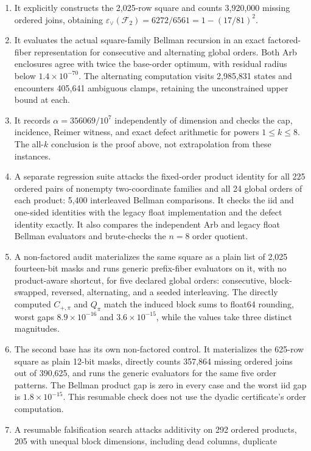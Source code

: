 \documentclass[11pt]{article}
\theoremstyle{remark}
\newcommand{\F}{\mathcal F}
\newcommand{\eps}{\varepsilon}
\begin{document}
\begin{enumerate}
\item It explicitly constructs the 2,025-row square and counts 3,920,000
missing ordered joins, obtaining
$\eps_\vee(\F_2)=6272/6561=1-(17/81)^2$.
\item It evaluates the actual square-family Bellman recursion in an exact
factored-fiber representation for consecutive and alternating global orders.
Both Arb enclosures agree with twice the base-order optimum, with residual
radius below $1.4\times10^{-70}$.  The alternating computation visits
2,985,831 states and encounters 405,641 ambiguous clamps, retaining the
unconstrained upper bound at each.
\item It records $\alpha=356069/10^7$ independently of dimension and checks the
cap, incidence, Reimer witness, and exact defect arithmetic for powers
$1\le k\le8$.  The all-$k$ conclusion is the proof above, not extrapolation
from these instances.
\item A separate regression suite attacks the fixed-order product identity for
all 225 ordered pairs of nonempty two-coordinate families and all 24 global
orders of each product: 5,400 interleaved Bellman comparisons.  It checks the
iid and one-sided identities with the legacy float implementation and the
defect identity exactly.  It also compares the independent Arb and legacy
float Bellman evaluators and brute-checks the $n=8$ order quotient.
\item A non-factored audit materializes the same square as a plain list of
2,025 fourteen-bit masks and runs generic prefix-fiber evaluators on it, with
no product-aware shortcut, for five declared global orders: consecutive,
block-swapped, reversed, alternating, and a seeded interleaving.  The directly
computed $C_{+,\pi}$ and $Q_\pi$ match the induced block sums to float64
rounding, worst gaps $8.9\times10^{-16}$ and $3.6\times10^{-15}$, while the
values take three distinct magnitudes.
\item The second base has its own non-factored control.  It materializes the
625-row square as plain 12-bit masks, directly counts 357,864 missing ordered
joins out of 390,625, and runs the generic evaluators for the same five order
patterns.  The Bellman product gap is zero in every case and the worst iid gap
is $1.8\times10^{-15}$.  This resumable check does not use the dyadic
certificate's order computation.
\item A resumable falsification search attacks additivity on 292 ordered
products, 205 with unequal block dimensions, including dead columns, duplicate

\end{enumerate}
\end{document}
